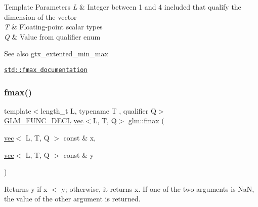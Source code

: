 \begin{DoxyTemplParams}{Template Parameters}
{\em L} & Integer between 1 and 4 included that qualify the dimension of the vector \\
\hline
{\em T} & Floating-\/point scalar types \\
\hline
{\em Q} & Value from qualifier enum\\
\hline
\end{DoxyTemplParams}
\begin{DoxySeeAlso}{See also}
gtx\+\_\+extented\+\_\+min\+\_\+max 

\href{http://en.cppreference.com/w/cpp/numeric/math/fmax}{\tt std\+::fmax documentation} 
\end{DoxySeeAlso}
\mbox{\label{group__gtx__extended__min__max_ga538c9e7de1d0cb8157e548691487d32a}} 
\subsubsection{\texorpdfstring{fmax()}{fmax()}\hspace{0.1cm}{\footnotesize\ttfamily [3/3]}}
{\footnotesize\ttfamily template$<$length\+\_\+t L, typename T , qualifier Q$>$ \\
\mbox{\hyperlink{setup_8hpp_ab2d052de21a70539923e9bcbf6e83a51}{G\+L\+M\+\_\+\+F\+U\+N\+C\+\_\+\+D\+E\+CL}} \mbox{\hyperlink{structglm_1_1vec}{vec}}$<$L, T, Q$>$ glm\+::fmax (\begin{DoxyParamCaption}\item[{\mbox{\hyperlink{structglm_1_1vec}{vec}}$<$ L, T, Q $>$ const \&}]{x,  }\item[{\mbox{\hyperlink{structglm_1_1vec}{vec}}$<$ L, T, Q $>$ const \&}]{y }\end{DoxyParamCaption})}

Returns y if x $<$ y; otherwise, it returns x. If one of the two arguments is NaN, the value of the other argument is returned.


